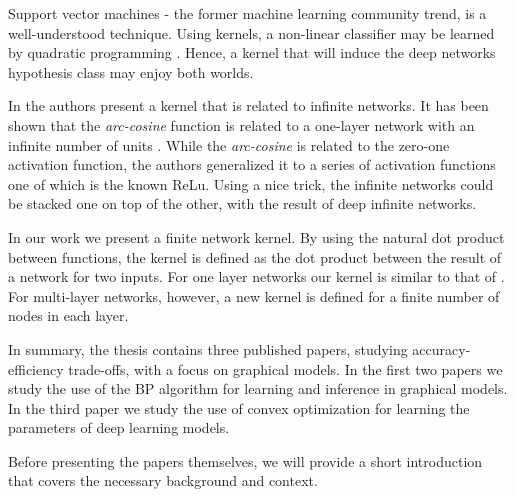  
Support vector machines - the former machine learning community trend, is a well-understood technique.
Using kernels, a non-linear classifier may be learned by quadratic programming \cite{scholkopf2002learning}.
Hence, a kernel that will induce the deep networks hypothesis class may enjoy both worlds.

In  \cite{cho2009kernel} the authors present a kernel that is related to infinite networks.
It has been shown that the \textit{arc-cosine} function is related to a one-layer network with an infinite number of units  \cite{williams1998computation}.
While the \textit{arc-cosine} is related to the zero-one activation function, the authors generalized it to a series of activation functions one of which is the known ReLu.
Using a nice trick, the infinite networks could be stacked one on top of the other, with the result of deep infinite networks.

In our work  \cite{heinemann2016improper} we present a finite network kernel.
By using the natural dot product between functions, the kernel is defined as the dot product between the result of a network for two inputs.
For one layer networks our kernel is similar to that of  \cite{cho2009kernel}.
For multi-layer networks, however, a new kernel is defined for a finite number of nodes in each layer.

In summary, the thesis contains three published papers, studying accuracy-efficiency trade-offs, with a focus on graphical models. In the first two papers we study the use of the BP algorithm for learning and inference in graphical models. In the third paper we study the use of convex optimization for learning the parameters of deep learning models. 

Before presenting the papers themselves, we will provide a short introduction that covers the necessary background and context.
 

